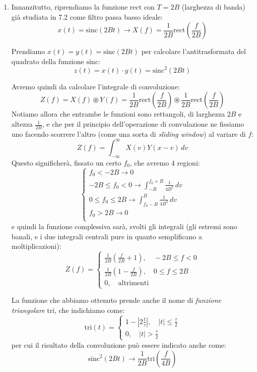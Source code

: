 \documentclass[a4paper,11pt]{article}
\begin{document}
\begin{enumerate}
	\item Innanzitutto, riprendiamo la funzione $\mathrm{rect}$ con $T = 2B$ (larghezza di banda) già studiata in 7.2 come filtro passa basso ideale:
$$
x(t) = \mathrm{sinc}(2Bt) \rightarrow X(f) = \frac{1}{2B} \mathrm{rect}\left(\frac{f}{2B}\right)
$$

Prendiamo $x(t) = y(t) = \mathrm{sinc}(2Bt)$ per calcolare l'antitrasformata del quadrato della funzione $\mathrm{sinc}$:
$$
z(t) = x(t) \cdot y(t) =  \mathrm{sinc}^2(2Bt)
$$

Avremo quindi da calcolare l'integrale di convoluzione:
$$
Z(f) = X(f) \circledast Y(f) = \frac{1}{2B} \mathrm{rect}\left( \frac{f}{2B} \right) \circledast \frac{1}{2B} \mathrm{rect}\left( \frac{f}{2B} \right)
$$
Notiamo allora che entrambe le funzioni sono rettangoli, di larghezza $2B$ e altezza $\frac{1}{2B}$, e che per il principio dell'operazione di convulazione ne fissiamo uno facendo scorrere l'altro (come una sorta di \textit{sliding window}) al variare di $f$:
$$
Z(f) = \int_{-\infty}^{\infty} X(v) Y(x - v) \, dv
$$
Questo significherà, fissato un certo $f_0$, che avremo 4 regioni:
$$
\begin{cases}
f_0 < -2B \rightarrow 0 \\
-2B \leq f_0 < 0 \rightarrow \int_{-B}^{f_0 + B} \frac{1}{4B^2} \, dv  \\ 
0 \leq f_0 \leq 2B \rightarrow \int_{f_0 - B}^{B} \frac{1}{4B^2} \, dv \\ 
f_0 > 2B \rightarrow 0 \\
\end{cases}
$$
e quindi la funzione complessiva sarà, svolti gli integrali (gli estremi sono banali, e i due integrali centrali pure in quanto semplificano a moltiplicazioni):
$$
Z(f) =
\begin{cases}
	\frac{1}{2B} \left( \frac{f}{2B} + 1 \right), \quad -2B \leq f < 0 \\
	\frac{1}{2B} \left( 1 - \frac{f}{2B} \right), \quad 0 \leq f \leq 2B \\
	0, \quad \text{altrimenti}
\end{cases}
$$

La funzione che abbiamo ottenuto prende anche il nome di \textit{funzione triangolare} $\mathrm{tri}$, che indichiamo come:
$$
\mathrm{tri}(t) =
\begin{cases}
	1 - |2\frac{t}{\tau}|, \quad |t| \leq \frac{\tau}{2} \\
	0, \quad |t| > \frac{\tau}{2}
\end{cases}
$$
per cui il risultato della convoluzione può essere indicato anche come:
$$
\mathrm{sinc}^2 (2Bt) \rightarrow \frac{1}{2B} \mathrm{tri} \left( \frac{f}{4B} \right)
$$


\end{enumerate}
\end{document}
